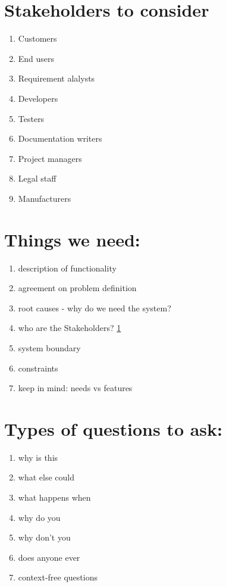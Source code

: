 \documentclass[letterpaper]{article}
\begin{document}
\section{Stakeholders to consider}
\label{stakeholders}
\begin{enumerate}
 \item Customers
 \item End users
 \item Requirement alalysts
 \item Developers
 \item Testers
 \item Documentation writers
 \item Project managers
 \item Legal staff
 \item Manufacturers
\end{enumerate}

\section{Things we need:}
\begin{enumerate}
 \item description of functionality
 \item agreement on problem definition
 \item root causes - why do we need the system?
 \item who are the Stakeholders?  \ref{stakeholders}
 \item system boundary
 \item constraints
 \item keep in mind: needs vs features
\end{enumerate}

\section{Types of questions to ask:}
\begin{enumerate}
 \item why is this
 \item what else could
 \item what happens when
 \item why do you
 \item why don't you
 \item does anyone ever
 \item context-free questions
\end{enumerate}
\end{document}
